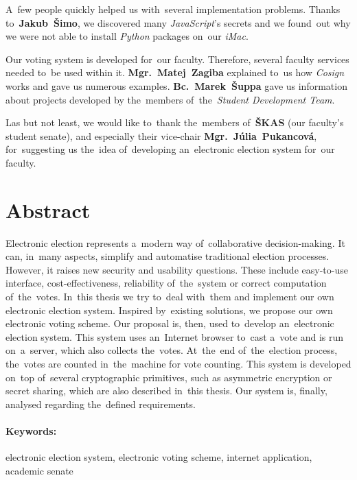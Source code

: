 \documentclass[12pt, oneside]{book}
\begin{document}
A~few people quickly helped us with~several implementation problems. Thanks to~\textbf{Jakub~Šimo}, we discovered many \emph{JavaScript}'s secrets and we found~out why we were not able to install \emph{Python} packages on~our \emph{iMac}.

Our voting system is developed for~our faculty. Therefore, several faculty services needed to~be used within it. \textbf{Mgr.~Matej~Zagiba} explained to~us how \emph{Cosign} works and gave us numerous examples. \textbf{Bc.~Marek~Šuppa} gave us information about projects developed by the~members of~the~\emph{Student Development Team}.

Las but not least, we would like to~thank the~members of~\textbf{ŠKAS} (our faculty's student senate), and especially their vice-chair \textbf{Mgr.~Júlia~Pukancová}, for~suggesting us the~idea of~developing an~electronic election system for~our faculty.



\newpage 
\section*{Abstract}

Electronic election represents a~modern way of~collaborative decision-making. It can, in~many aspects, simplify and automatise traditional election processes. However, it raises new security and usability questions. These include easy-to-use interface, cost-effectiveness, reliability of~the~system or correct computation of~the~votes. In~this thesis we try to~deal with~them and implement our own electronic election system. Inspired by~existing solutions, we propose our own electronic voting scheme. Our proposal is, then, used to~develop an~electronic election system. This system uses an~Internet browser to~cast a~vote and is run on~a~server, which also collects the~votes. At~the~end of~the~election process, the~votes are counted in~the~machine for vote counting. This system is developed on~top of~several cryptographic primitives, such as asymmetric encryption or secret sharing, which are also described in~this thesis. Our system is, finally, analysed regarding the~defined requirements.

\paragraph*{Keywords:} electronic election system, electronic voting scheme, internet application, academic senate
\end{document}
